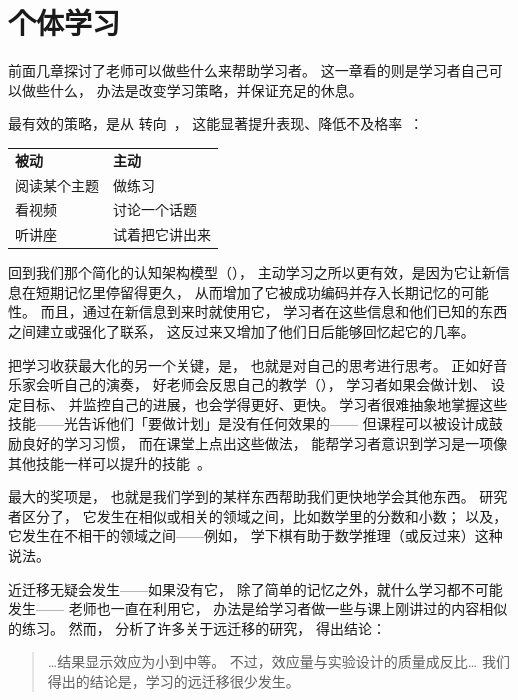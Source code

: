 \chapter{个体学习}\label{s:individual}

前面几章探讨了老师可以做些什么来帮助学习者。
这一章看的则是学习者自己可以做些什么，
办法是改变学习策略，并保证充足的休息。

最有效的策略，是从
转向~\cite{Hpl2018}，
这能显著提升表现、降低不及格率~\cite{Free2014}：

\begin{longtable}{ll}
\textbf{被动}		& \textbf{主动} \\
阅读某个主题		& 做练习 \\
看视频			& 讨论一个话题 \\
听讲座			& 试着把它讲出来
\end{longtable}

\noindent
回到我们那个简化的认知架构模型（），
主动学习之所以更有效，是因为它让新信息在短期记忆里停留得更久，
从而增加了它被成功编码并存入长期记忆的可能性。
而且，通过在新信息到来时就使用它，
学习者在这些信息和他们已知的东西之间建立或强化了联系，
这反过来又增加了他们日后能够回忆起它的几率。

把学习收获最大化的另一个关键，是，
也就是对自己的思考进行思考。
正如好音乐家会听自己的演奏，
好老师会反思自己的教学（），
学习者如果会做计划、
设定目标、
并监控自己的进展，也会学得更好、更快。
学习者很难抽象地掌握这些技能——光告诉他们「要做计划」是没有任何效果的——
但课程可以被设计成鼓励良好的学习习惯，
而在课堂上点出这些做法，
能帮学习者意识到学习是一项像其他技能一样可以提升的技能~\cite{McGu2015,Miya2018}。

最大的奖项是，
也就是我们学到的某样东西帮助我们更快地学会其他东西。
研究者区分了，
它发生在相似或相关的领域之间，比如数学里的分数和小数；
以及，
它发生在不相干的领域之间——例如，
学下棋有助于数学推理（或反过来）这种说法。

近迁移无疑会发生——如果没有它，
除了简单的记忆之外，就什么学习都不可能发生——
老师也一直在利用它，
办法是给学习者做一些与课上刚讲过的内容相似的练习。
然而，
\cite{Sala2017}分析了许多关于远迁移的研究，
得出结论：

\begin{quote}

  {\ldots}结果显示效应为小到中等。
  不过，效应量与实验设计的质量成反比{\ldots}
  我们得出的结论是，学习的远迁移很少发生。

\end{quote}

